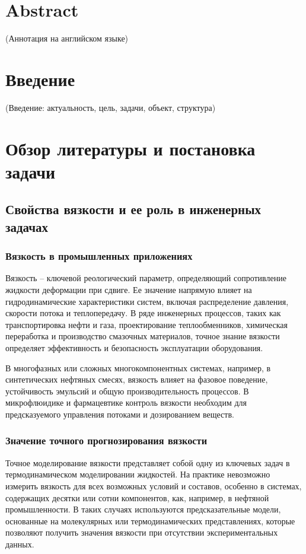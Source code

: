 \documentclass[a4paper,12pt]{article}
\begin{document}
\section*{Abstract}
(Аннотация на английском языке)
\newpage

\tableofcontents
\newpage

\section*{Введение}
(Введение: актуальность, цель, задачи, объект, структура)

\section{Обзор литературы и постановка задачи}
  \subsection{Свойства вязкости и ее роль в инженерных задачах}

    \subsubsection{Вязкость в промышленных приложениях}

Вязкость -- ключевой реологический параметр, определяющий сопротивление жидкости деформации при сдвиге. Ее значение напрямую влияет на гидродинамические характеристики систем, включая распределение давления, скорости потока и теплопередачу. В ряде инженерных процессов, таких как транспортировка нефти и газа, проектирование теплообменников, химическая переработка и производство смазочных материалов, точное знание вязкости определяет эффективность и безопасность эксплуатации оборудования. 

В многофазных или сложных многокомпонентных системах, например, в синтетических нефтяных смесях, вязкость влияет на фазовое поведение, устойчивость эмульсий и общую производительность процессов. В микрофлюидике и фармацевтике контроль вязкости необходим для предсказуемого управления потоками и дозированием веществ.

    \subsubsection{Значение точного прогнозирования вязкости}

Точное моделирование вязкости представляет собой одну из ключевых задач в термодинамическом моделировании жидкостей. На практике невозможно измерить вязкость для всех возможных условий и составов, особенно в системах, содержащих десятки или сотни компонентов, как, например, в нефтяной промышленности. В таких случаях используются предсказательные модели, основанные на молекулярных или термодинамических представлениях, которые позволяют получить значения вязкости при отсутствии экспериментальных данных.
\end{document}

